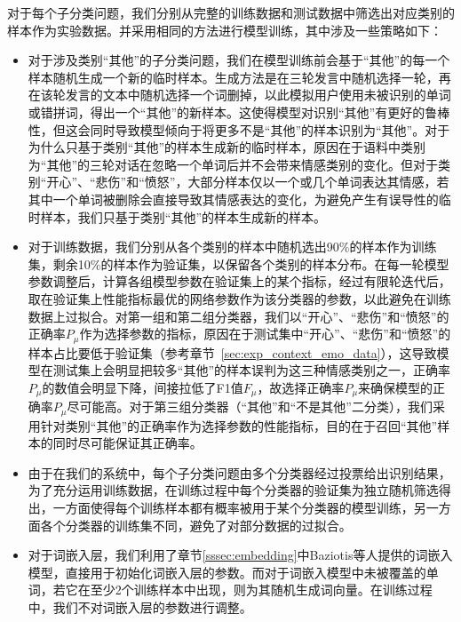 对于每个子分类问题，我们分别从完整的训练数据和测试数据中筛选出对应类别的样本作为实验数据。并采用相同的方法进行模型训练，其中涉及一些策略如下：

\begin{itemize}

\item 对于涉及类别“其他”的子分类问题，我们在模型训练前会基于“其他”的每一个样本随机生成一个新的临时样本。生成方法是在三轮发言中随机选择一轮，再在该轮发言的文本中随机选择一个词删掉，以此模拟用户使用未被识别的单词或错拼词，得出一个“其他”的新样本。这使得模型对识别“其他”有更好的鲁棒性，但这会同时导致模型倾向于将更多不是“其他”的样本识别为“其他”。对于为什么只基于类别“其他”的样本生成新的临时样本，原因在于语料中类别为“其他”的三轮对话在忽略一个单词后并不会带来情感类别的变化。但对于类别“开心”、“悲伤”和“愤怒”，大部分样本仅以一个或几个单词表达其情感，若其中一个单词被删除会直接导致其情感表达的变化，为避免产生有误导性的临时样本，我们只基于类别“其他”的样本生成新的样本。

\item 对于训练数据，我们分别从各个类别的样本中随机选出90\%的样本作为训练集，剩余10\%的样本作为验证集，以保留各个类别的样本分布。在每一轮模型参数调整后，计算各组模型参数在验证集上的某个指标，经过有限轮迭代后，取在验证集上性能指标最优的网络参数作为该分类器的参数，以此避免在训练数据上过拟合。对第一组和第二组分类器，我们以“开心”、“悲伤”和“愤怒”的正确率$P_\mu$作为选择参数的指标，原因在于测试集中“开心”、“悲伤”和“愤怒”的样本占比要低于验证集（参考章节~\ref{sec:exp_context_emo_data}），这导致模型在测试集上会明显把较多“其他”的样本误判为这三种情感类别之一，正确率$P_\mu$的数值会明显下降，间接拉低了F1值$F_\mu$，故选择正确率$P_\mu$来确保模型的正确率$P_\mu$尽可能高。对于第三组分类器（“其他”和“不是其他”二分类），我们采用针对类别“其他”的正确率作为选择参数的性能指标，目的在于召回“其他”样本的同时尽可能保证其正确率。

\item 由于在我们的系统中，每个子分类问题由多个分类器经过投票给出识别结果，为了充分运用训练数据，在训练过程中每个分类器的验证集为独立随机筛选得出，一方面使得每个训练样本都有概率被用于某个分类器的模型训练，另一方面各个分类器的训练集不同，避免了对部分数据的过拟合。

\item 对于词嵌入层，我们利用了章节\ref{sssec:embedding}中Baziotis等人\cite{baziotis2018ntua}提供的词嵌入模型，直接用于初始化词嵌入层的参数。而对于词嵌入模型中未被覆盖的单词，若它在至少2个训练样本中出现，则为其随机生成词向量。在训练过程中，我们不对词嵌入层的参数进行调整。


\end{itemize}

